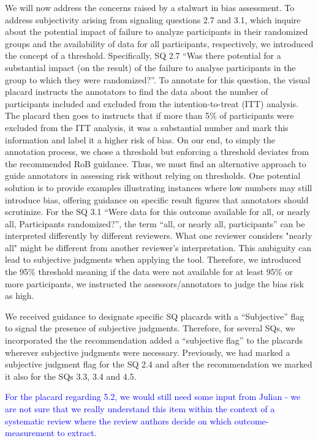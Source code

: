 \documentclass[sn-mathphys,Numbered]{sn-jnl}%
\theoremstyle{thmstyleone}%
\theoremstyle{thmstyletwo}%
\theoremstyle{thmstylethree}%
\begin{document}
We will now address the concerns raised by a stalwart in bias assessment.
To address subjectivity arising from signaling questions 2.7 and 3.1, which inquire about the potential impact of failure to analyze participants in their randomized groups and the availability of data for all participants, respectively, we introduced the concept of a threshold.
Specifically, SQ 2.7 ``Was there potential for a substantial impact (on the result) of the failure to analyse participants in the group to which they were randomized?''.
To annotate for this question, the visual placard instructs the annotators to find the data about the number of participants included and excluded from the intention-to-treat (ITT) analysis.
The placard then goes to instructs that if more than 5\% of participants were excluded from the ITT analysis, it was a substantial number and mark this information and label it a higher risk of bias.
On our end, to simply the annotation process, we chose a threshold but enforcing a threshold deviates from the recommended RoB guidance.
Thus, we must find an alternative approach to guide annotators in assessing risk without relying on thresholds.
One potential solution is to provide examples illustrating instances where low numbers may still introduce bias, offering guidance on specific result figures that annotators should scrutinize.
For the SQ 3.1 ``Were data for this outcome available for all, or nearly all, Participants randomized?'', the term ``all, or nearly all, participants'' can be interpreted differently by different reviewers.
What one reviewer considers "nearly all" might be different from another reviewer's interpretation.
This ambiguity can lead to subjective judgments when applying the tool.
Therefore, we introduced the 95\% threshold meaning if the data were not available for at least 95\% or more participants, we instructed the assessors/annotators to judge the bias risk as high.


We received guidance to designate specific SQ placards with a ``Subjective'' flag to signal the presence of subjective judgments.
Therefore, for several SQs, we incorporated the the recommendation added a ``subjective flag'' to the placards wherever subjective judgments were necessary.
Previously, we had marked a subjective judgment flag for the SQ 2.4 and after the recommendation we marked it also for the SQs 3.3, 3.4 and 4.5.


\textcolor{blue}{For the placard regarding 5.2, we would still need some input from Julian - we are not sure that we really understand this item within the context of a systematic review where the review authors decide on which outcome-measurement to extract. }
%
%
%
\end{document}
